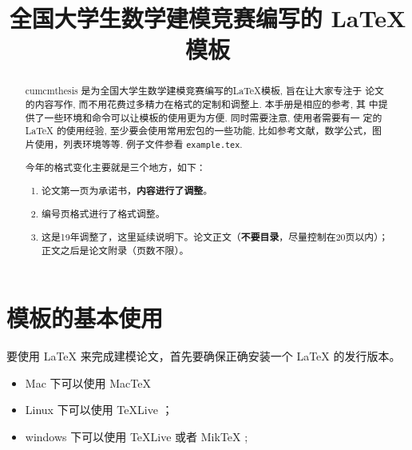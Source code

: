 \documentclass{cumcmthesis}
\title{全国大学生数学建模竞赛编写的 \LaTeX{} 模板}
\begin{document}
	
	\maketitle
	\begin{abstract}
		cumcmthesis 是为全国大学生数学建模竞赛编写的\LaTeX{}模板, 旨在让大家专注于 论文的内容写作, 而不用花费过多精力在格式的定制和调整上. 本手册是相应的参考, 其 中提供了一些环境和命令可以让模板的使用更为方便. 同时需要注意, 使用者需要有一 定的 \LaTeX{} 的使用经验, 至少要会使用常用宏包的一些功能, 比如参考文献，数学公式，图片使用，列表环境等等. 例子文件参看 \texttt{example.tex}.
		
		\begin{mdframed} [%
			roundcorner=5pt,
			linecolor=gray!50,
			outerlinewidth=0.5pt,
			middlelinewidth=0.3pt, backgroundcolor=gray!2,
			innertopmargin=\topskip, frametitle={2020 年建模比赛格式变化说明},
			frametitlefont= \bfseries,frametitlerule=true,frametitlealignment =\raggedright\noindent,
			frametitlerulewidth=.5pt, frametitlebackgroundcolor=gray!2,]
			今年的格式变化主要就是三个地方，如下：
			\begin{enumerate}
				\item 论文第一页为承诺书，\textbf{\color{red}内容进行了调整}。
				
				\item 编号页格式进行了格式调整。
				
				\item 这是19年调整了，这里延续说明下。论文正文（\textbf{\color{red}不要目录}，尽量控制在20页以内）；正文之后是论文附录（页数不限）。
				
			\end{enumerate}
			
		\end{mdframed}
		
	\end{abstract}
	
	
	
	\section{模板的基本使用}
	
	要使用 \LaTeX{} 来完成建模论文，首先要确保正确安装一个 \LaTeX{} 的发行版本。
	
	\begin{itemize}
		\item Mac 下可以使用 Mac\TeX{}
		\item Linux 下可以使用 \TeX{}Live ；
		\item windows 下可以使用 \TeX{}Live 或者 Mik\TeX{} ;
	\end{itemize}
	
\end{document}
